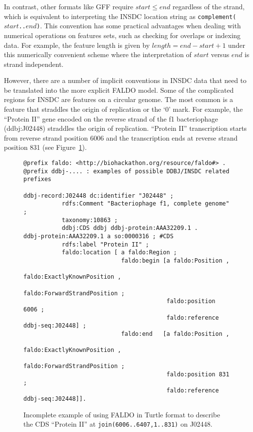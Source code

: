 In contrast, other formats like GFF require $start \leq end$
regardless of the strand, which is equivalent to interpreting
the INSDC location string as \texttt{complement($start$..$end$)}.
This convention has some practical advantages when
dealing with numerical operations on features sets, such as
checking for overlaps or indexing data. For example, the
feature length is given by $length = end - start + 1$ under
this numerically convenient scheme where the interpretation
of $start$ versus $end$ is strand independent.

However, there are a number of implicit conventions in INSDC data that need to be translated into the more explicit FALDO model.
Some of the complicated regions for INSDC are features on a circular genome. 
The most common is  a feature that straddles the origin of replication or the `0' mark.
For example, the ``Protein II'' gene encoded on the reverse strand of the f1 bacteriophage (ddbj:J02448) straddles the origin of replication.
``Protein II'' transcription starts from reverse strand position 6006 and the transcription ends at reverse strand position 831 (see Figure~\ref{fig:insdcReverseOverOrigin}).


\begin{figure}
\begin{shaded}
\small
\begin{verbatim}
@prefix faldo: <http://biohackathon.org/resource/faldo#> .
@prefix ddbj-.... : examples of possible DDBJ/INSDC related prefixes

ddbj-record:J02448 dc:identifier "J02448" ;
           rdfs:Comment "Bacteriophage f1, complete genome" ;
           taxonomy:10863 ;
           ddbj:CDS ddbj ddbj-protein:AAA32209.1 .
ddbj-protein:AAA32209.1 a so:0000316 ; #CDS
           rdfs:label "Protein II" ;
           faldo:location [ a faldo:Region ;
                            faldo:begin [a faldo:Position ,
                                           faldo:ExactlyKnownPosition ,
                                           faldo:ForwardStrandPosition ;
                                         faldo:position 6006 ;
                                         faldo:reference ddbj-seq:J02448] ;
                            faldo:end   [a faldo:Position , 
                                           faldo:ExactlyKnownPosition ,
                                           faldo:ForwardStrandPosition ;
                                         faldo:position 831 ;
                                         faldo:reference ddbj-seq:J02448]].
\end{verbatim}
\end{shaded}
\caption{Incomplete example of using FALDO in Turtle format to describe
the CDS ``Protein II'' at \texttt{join(6006..6407,1..831)} on J02448.}
\label{fig:insdcReverseOverOrigin}
\end{figure}


